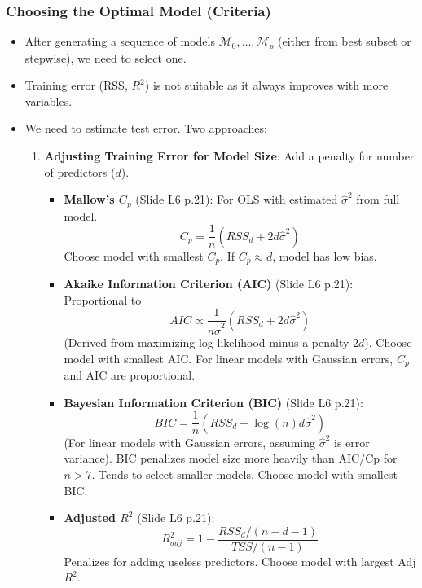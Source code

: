 \documentclass[12pt,a4paper]{article}
\begin{document}
\begin{itemize}
\begin{itemize}
\begin{itemize}
    \subsubsection{Choosing the Optimal Model (Criteria)}
        \begin{itemize}
            \item After generating a sequence of models $\mathcal{M}_0, \dots, \mathcal{M}_p$ (either from best subset or stepwise), we need to select one.
            \item Training error (RSS, $R^2$) is not suitable as it always improves with more variables.
            \item We need to estimate test error. Two approaches:
                \begin{enumerate}
                    \item \textbf{Adjusting Training Error for Model Size}: Add a penalty for number of predictors ($d$).
                        \begin{itemize}
                            \item \textbf{Mallow's $C_p$} (Slide L6 p.21): For OLS with estimated $\hat{\sigma}^2$ from full model.
                                $$ C_p = \frac{1}{n}(RSS_d + 2d\hat{\sigma}^2) $$
                                Choose model with smallest $C_p$. If $C_p \approx d$, model has low bias.
                            \item \textbf{Akaike Information Criterion (AIC)} (Slide L6 p.21): Proportional to
                                $$ AIC \propto \frac{1}{n\hat{\sigma}^2}(RSS_d + 2d\hat{\sigma}^2) $$
                                (Derived from maximizing log-likelihood minus a penalty $2d$). Choose model with smallest AIC. For linear models with Gaussian errors, $C_p$ and AIC are proportional.
                            \item \textbf{Bayesian Information Criterion (BIC)} (Slide L6 p.21):
                                $$ BIC = \frac{1}{n}(RSS_d + \log(n)d\hat{\sigma}^2) $$
                                (For linear models with Gaussian errors, assuming $\hat{\sigma}^2$ is error variance). BIC penalizes model size more heavily than AIC/Cp for $n>7$. Tends to select smaller models. Choose model with smallest BIC.
                            \item \textbf{Adjusted $R^2$} (Slide L6 p.21):
                                $$ R^2_{adj} = 1 - \frac{RSS_d/(n-d-1)}{TSS/(n-1)} $$
                                Penalizes for adding useless predictors. Choose model with largest Adj $R^2$.

\end{itemize}
\end{enumerate}
\end{itemize}
\end{itemize}
\end{itemize}
\end{itemize}
\end{document}
